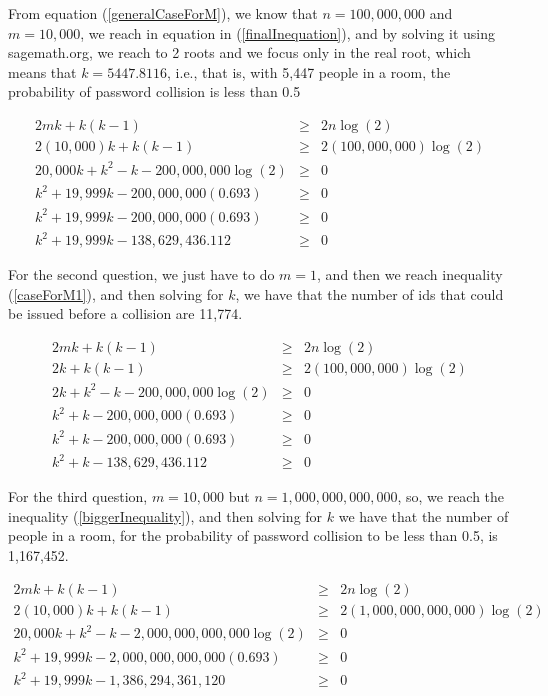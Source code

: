 \documentclass[tikz, 12pt]{scrartcl}
\begin{document}
\begin{enumerate}
	From equation (\ref{generalCaseForM}), we know that $n = 100,000,000$ and $m = 10,000$, we reach in equation in (\ref{finalInequation}), and by solving it using sagemath.org, we reach to 2 roots and we focus only in the real root, which means that $k = 5447.8116$, i.e., that is, with 5,447 people in a room, the probability of password collision is less than 0.5
	
	\begin{eqnarray}
	2mk + k(k - 1)						&	\geq	&	2n \log(2) \nonumber \\
	2(10,000)k + k(k - 1)					&	\geq	&	2(100,000,000) \log(2) \nonumber \\
	20,000k + k^2 - k - 200,000,000 \log(2)	&	\geq	& 	0 \nonumber \\
	k^2 + 19,999k - 200,000,000(0.693)		&	\geq	&	0 \nonumber \\
	k^2 + 19,999k - 200,000,000(0.693)		&	\geq	&	0 \nonumber \\
	k^2 + 19,999k - 138,629,436.112		&	\geq	&	0 \label{finalInequation}
	\end{eqnarray}
	
	For the second question, we just have to do $m = 1$, and then we reach inequality (\ref{caseForM1}), and then solving for $k$, we have that the number of ids that could be issued before a collision are 11,774.
	
	\begin{eqnarray}
	2mk + k(k - 1)						&	\geq	&	2n \log(2) \nonumber \\
	2k + k(k - 1)					&	\geq	&	2(100,000,000) \log(2) \nonumber \\
	2k + k^2 - k - 200,000,000 \log(2)	&	\geq	& 	0 \nonumber \\
	k^2 + k - 200,000,000(0.693)		&	\geq	&	0 \nonumber \\
	k^2 + k - 200,000,000(0.693)		&	\geq	&	0 \nonumber \\
	k^2 + k - 138,629,436.112		&	\geq	&	0 \label{caseForM1}
	\end{eqnarray}
	
	For the third question, $m = 10,000$ but $n = 1,000,000,000,000$, so, we reach the inequality (\ref{biggerInequality}), and then solving for $k$ we have that the number of people in a room, for the probability of password collision to be less than 0.5, is 1,167,452.
	
	\begin{eqnarray}
	2mk + k(k - 1)						&	\geq	&	2n \log(2) \nonumber \\
	2(10,000)k + k(k - 1)					&	\geq	&	2( 1,000,000,000,000) \log(2) \nonumber \\
	20,000k + k^2 - k -  2,000,000,000,000 \log(2)	&	\geq	& 	0 \nonumber \\
	k^2 + 19,999k -  2,000,000,000,000(0.693)		&	\geq	&	0 \nonumber \\
	k^2 + 19,999k - 1,386,294,361,120		&	\geq	&	0 \label{biggerInequality}
	\end{eqnarray}


\end{enumerate}
\end{document}
